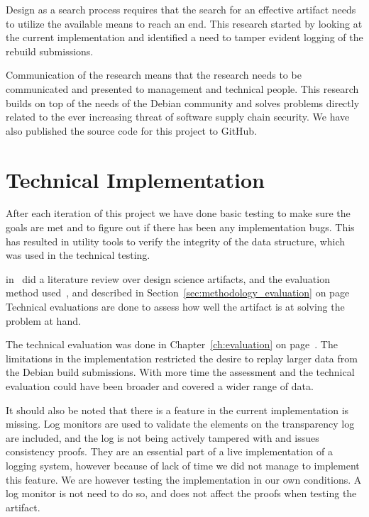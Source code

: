 \documentclass[../Main/thesis.tex]{subfiles}
\begin{document}
Design as a search process requires that the search for an effective artifact
needs to utilize the available means to reach an end. This research started by
looking at the current implementation and identified a need to tamper evident
logging of the rebuild submissions.

Communication of the research means that the research needs to be communicated
and presented to management and technical people. This research builds on top of
the needs of the Debian community and solves problems directly related to the
ever increasing threat of software supply chain security. We have also published
the source code for this project to GitHub.

\section{Technical Implementation}%
\label{sec:technical_Implementation}
After each iteration of this project we have done basic testing to make sure the
goals are met and to figure out if there has been any implementation bugs. This
has resulted in utility tools to verify the integrity of the data structure,
which was used in the technical testing.

\citeauthor{Peffers:2012:DSR:2342209.2342243}
in~ did a literature review over
design science artifacts, and the evaluation method
used~\cite{Peffers:2012:DSR:2342209.2342243}, and described in
Section~\ref{sec:methodology_evaluation} on
page~\pageref{sec:methodology_evaluation} Technical evaluations are done to
assess how well the artifact is at solving the problem at hand.

The technical evaluation was done in Chapter~\ref{ch:evaluation} on
page~\pageref{ch:evaluation}. The limitations in the implementation restricted
the desire to replay larger data from the Debian build submissions. With more
time the assessment and the technical evaluation could have been broader and
covered a wider range of data.

It should also be noted that there is a feature in the current implementation is
missing. Log monitors are used to validate the elements on the transparency log
are included, and the log is not being actively tampered with and issues
consistency proofs. They are an essential part of a live implementation of a
logging system, however because of lack of time we did not manage to implement
this feature. We are however testing the implementation in our own conditions.
A log monitor is not need to do so, and does not affect the proofs when testing
the artifact.
\end{document}
